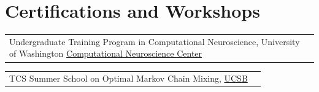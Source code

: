 \section{\sc Certifications and Workshops}

\begin{tabular}{@{}p{4in}p{2in}}
Undergraduate Training Program in Computational Neuroscience, University of Washington \href{https://compneuro.washington.edu/}{Computational Neuroscience Center} & \\
\end{tabular}

\begin{tabular}{@{}p{4in}p{2in}}
TCS Summer School on Optimal Markov Chain Mixing, \href{https://sites.cs.ucsb.edu/~vigoda/School/program.html}{UCSB} & \\
\end{tabular}


\endinput
